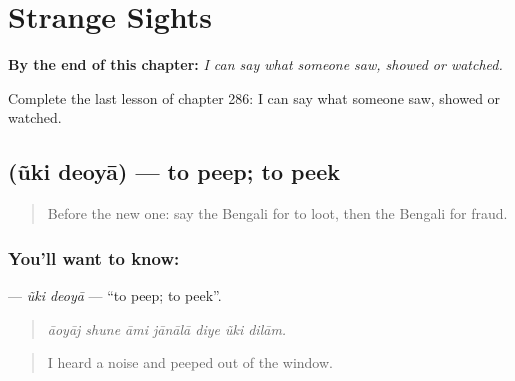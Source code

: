 
\chapter{Strange Sights}
\label{ch:bn-strange-sights}

\begin{chapteropening}
\textbf{By the end of this chapter:} \emph{I can say what someone saw, showed or watched.}

Complete the last lesson of chapter 286: I can say what someone saw, showed or watched.
\end{chapteropening}

\section[\texorpdfstring{\bn{উঁকি} \bn{দেওয়া} (ũki deoyā)}{উঁকি দেওয়া (ũki deoyā)}]{  (ũki deoyā) — to peep; to peek}

\label{lesson:BN-C286-uki-deoya}



\begin{quote}
Before the new one: say the Bengali for to loot, then the Bengali for fraud.
\end{quote}

\subsection*{You'll want to know:  }
\textbf{ } — \emph{ũki deoyā} — \textquotedblleft{}to peep; to peek\textquotedblright{}.

\begin{quote}
      
\end{quote}

\begin{quote}
\emph{āoyāj shune āmi jānālā diye ũki dilām.}
\end{quote}

\begin{quote}
I heard a noise and peeped out of the window.
\end{quote}

